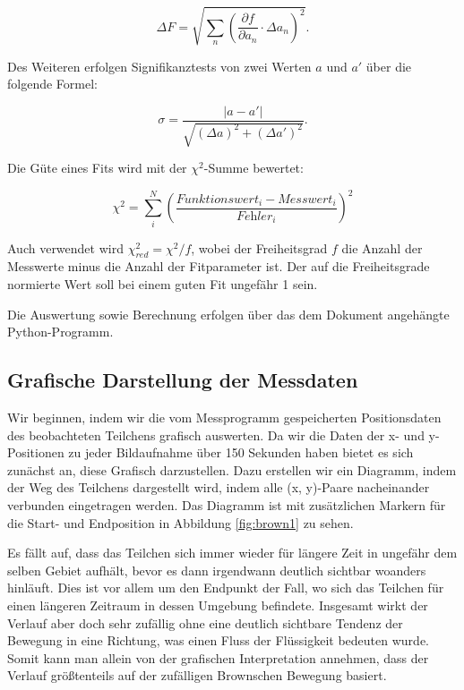\documentclass{article}
\begin{document}
\begin{equation}
    \Delta F = \sqrt{\sum_n \left( \frac{\partial f}{\partial a_n} \cdot \Delta a_n \right)^2}.
\end{equation}

Des Weiteren erfolgen Signifikanztests von zwei Werten $a$ und $a'$ über die folgende Formel:

\begin{equation}
    \sigma = \frac{|a-a'|}{\sqrt{(\Delta a)^2 + (\Delta a')^2}}.
\end{equation}

Die Güte eines Fits wird mit der $\chi^2$-Summe bewertet:

\begin{equation}
    \chi^2 = \sum_i^N \left( \frac{\textit{Funktionswert}_i - \textit{Messwert}_i}{\textit{Fehler}_i} \right)^2
\end{equation}

Auch verwendet wird $\chi^2_{red} = \chi^2 / f$, wobei der Freiheitsgrad $f$ die Anzahl der Messwerte minus die Anzahl der Fitparameter ist. Der auf die Freiheitsgrade normierte Wert soll bei einem guten Fit ungefähr 1 sein.

Die Auswertung sowie Berechnung erfolgen über das dem Dokument angehängte Python-Programm.

\newpage

\subsection{Grafische Darstellung der Messdaten} \label{grafisch}

Wir beginnen, indem wir die vom Messprogramm gespeicherten Positionsdaten des beobachteten Teilchens grafisch auswerten. Da wir die Daten der x- und y-Positionen zu jeder Bildaufnahme über 150 Sekunden haben bietet es sich zunächst an, diese Grafisch darzustellen. Dazu erstellen wir ein Diagramm, indem der Weg des Teilchens dargestellt wird, indem alle (x, y)-Paare nacheinander verbunden eingetragen werden. Das Diagramm ist mit zusätzlichen Markern für die Start- und Endposition in Abbildung \ref{fig:brown1} zu sehen.  

Es fällt auf, dass das Teilchen sich immer wieder für längere Zeit in ungefähr dem selben Gebiet aufhält, bevor es dann irgendwann deutlich sichtbar woanders hinläuft. Dies ist vor allem um den Endpunkt der Fall, wo sich das Teilchen für einen längeren Zeitraum in dessen Umgebung befindete. Insgesamt wirkt der Verlauf aber doch sehr zufällig ohne eine deutlich sichtbare Tendenz der Bewegung in eine Richtung, was einen Fluss der Flüssigkeit bedeuten wurde. Somit kann man allein von der grafischen Interpretation annehmen, dass der Verlauf größtenteils auf der zufälligen Brownschen Bewegung basiert.   
\end{document}
